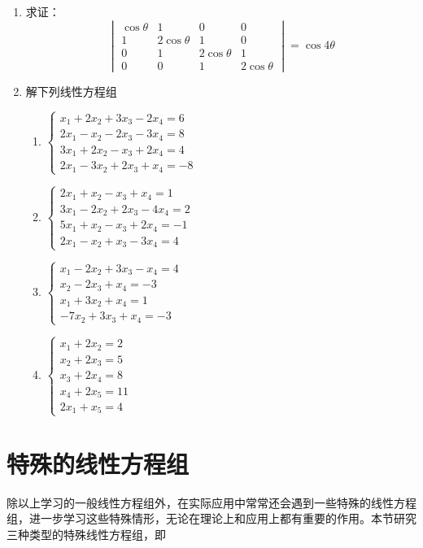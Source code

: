 \begin{enumerate}
\item 求证：
\[\begin{vmatrix}
\cos\theta & 1&0&0\\
1&2\cos\theta&1&0\\
0&1&2\cos\theta&1\\
0&0&1&2\cos\theta    
\end{vmatrix}=\cos4\theta\]

\item 解下列线性方程组
\begin{multicols}{2}
    \begin{enumerate}
    \item $\begin{cases}
 x_1+2x_2+3x_3-2x_4=6\\
 2x_1-x_2-2x_3-3x_4=8\\
 3x_1+2x_2-x_3+2x_4=4\\
 2x_1-3x_2+2x_3+x_4=-8       
    \end{cases}$
    \item $\begin{cases}
2x_1+x_2-x_3+x_4=1\\
3x_1-2x_2+2x_3-4x_4=2\\
5x_1+x_2-x_3+2x_4=-1\\
2x_1-x_2+x_3-3x_4=4        
    \end{cases}$
    \item $\begin{cases}
 x_1-2x_2+3x_3-x_4=4\\
 x_2-2x_3+x_4=-3\\
 x_1+3x_2+x_4=1\\
 -7x_2+3x_3+x_4=-3       
    \end{cases}$
    \item $\begin{cases}
x_1+2x_2=2\\
x_2+2x_3=5\\
x_3+2x_4=8\\
x_4+2x_5=11\\
2x_1+x_5=4    
    \end{cases}$
\end{enumerate}
\end{multicols}

\end{enumerate}

\section{特殊的线性方程组}
除以上学习的一般线性方程组外，在实际应用中常常还会遇到一些特殊的线性方程组，进一步学习这些特殊情形，无论在理论上和应用上都有重要的作用。本节研究三种类型的特殊线性方程组，即


